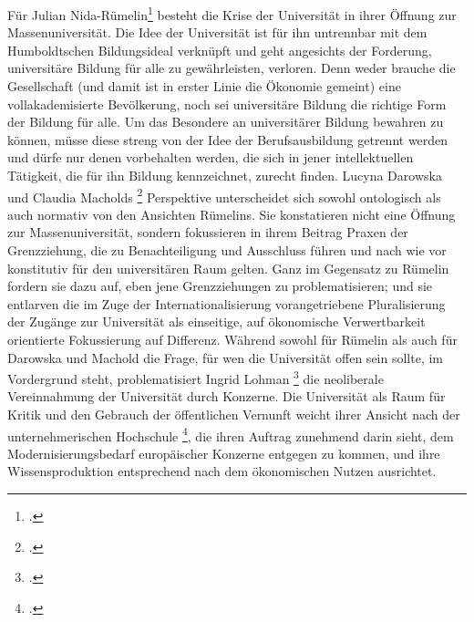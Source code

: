 \documentclass[11pt]{article}
\begin{document}
  Für Julian Nida-Rümelin\footnotemark \footcitetext{nida} besteht die Krise
  der Universität in ihrer Öffnung zur Massenuniversität. Die Idee der
  Universität ist für ihn untrennbar mit dem \glqq Humboldtschen Bildungsideal
  \grqq \footnotemark {} verknüpft und geht angesichts der
Forderung, universitäre Bildung für alle zu gewährleisten, verloren. Denn weder
brauche die Gesellschaft (und damit ist in erster Linie die Ökonomie gemeint)
eine vollakademisierte Bevölkerung, noch sei universitäre Bildung die richtige
Form der Bildung für alle. Um das Besondere an universitärer Bildung bewahren
zu können, müsse diese streng von der Idee der Berufsausbildung getrennt werden
und dürfe nur denen vorbehalten werden, die sich in jener intellektuellen
Tätigkeit, die für ihn Bildung kennzeichnet, zurecht finden. Lucyna Darowska
und Claudia Macholds \footnotemark \footcitetext{lucyna} Perspektive unterscheidet sich sowohl ontologisch als
auch normativ von den Ansichten Rümelins. Sie konstatieren nicht eine Öffnung
zur Massenuniversität, sondern fokussieren in ihrem Beitrag Praxen der
Grenzziehung, die zu Benachteiligung und Ausschluss führen und nach wie vor
konstitutiv für den universitären Raum gelten. Ganz im Gegensatz zu Rümelin
fordern sie dazu auf, eben jene Grenzziehungen zu problematisieren; und sie
entlarven die im Zuge der Internationalisierung vorangetriebene Pluralisierung
der Zugänge zur Universität als einseitige, auf ökonomische Verwertbarkeit
orientierte Fokussierung auf Differenz.  Während sowohl für Rümelin als auch
für Darowska und Machold die Frage, für wen die Universität offen sein sollte,
im Vordergrund steht, problematisiert Ingrid Lohman \footnotemark
\footcitetext{lohman} die neoliberale
Vereinnahmung der Universität durch Konzerne. Die Universität als Raum für
Kritik und den Gebrauch der öffentlichen Vernunft weicht ihrer Ansicht nach der
\glqq unternehmerischen Hochschule \grqq \footnotemark \footcitetext{lohmein}, die ihren Auftrag zunehmend darin sieht, dem
Modernisierungsbedarf europäischer Konzerne entgegen zu kommen, und ihre
Wissensproduktion entsprechend nach dem ökonomischen Nutzen ausrichtet. 
\end{document}
